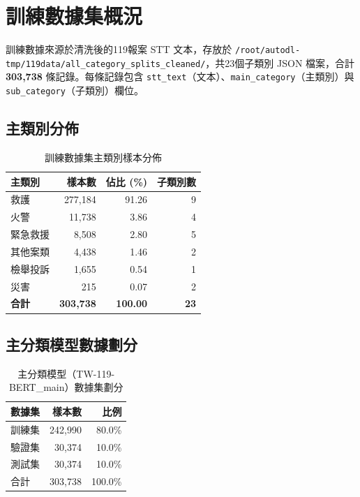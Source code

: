 \documentclass[UTF8,a4paper,11pt]{ctexart}
\begin{document}
\section{訓練數據集概況}

訓練數據來源於清洗後的119報案 STT 文本，存放於 \texttt{/root/autodl-tmp/119data/all\_category\_splits\_cleaned/}，共23個子類別 JSON 檔案，合計 \textbf{303,738} 條記錄。每條記錄包含 \texttt{stt\_text}（文本）、\texttt{main\_category}（主類別）與 \texttt{sub\_category}（子類別）欄位。

\subsection{主類別分佈}

\begin{table}[htbp]
  \centering
  \caption{訓練數據集主類別樣本分佈}
  \label{tab:main-dist}
  \begin{tabular}{lrrr}
    \toprule
    主類別 & 樣本數 & 佔比 (\%) & 子類別數 \\
    \midrule
    救護       & 277,184 & 91.26 & 9 \\
    火警       &  11,738 &  3.86 & 4 \\
    緊急救援   &   8,508 &  2.80 & 5 \\
    其他案類   &   4,438 &  1.46 & 2 \\
    檢舉投訴   &   1,655 &  0.54 & 1 \\
    災害       &     215 &  0.07 & 2 \\
    \midrule
    \textbf{合計} & \textbf{303,738} & \textbf{100.00} & \textbf{23} \\
    \bottomrule
  \end{tabular}
\end{table}

\subsection{主分類模型數據劃分}

\begin{table}[htbp]
  \centering
  \caption{主分類模型（TW-119-BERT\_main）數據集劃分}
  \label{tab:main-split}
  \begin{tabular}{lrr}
    \toprule
    數據集 & 樣本數 & 比例 \\
    \midrule
    訓練集 & 242,990 & 80.0\% \\
    驗證集 &  30,374 & 10.0\% \\
    測試集 &  30,374 & 10.0\% \\
    \midrule
    合計   & 303,738 & 100.0\% \\
    \bottomrule
  \end{tabular}
\end{table}
\end{document}
